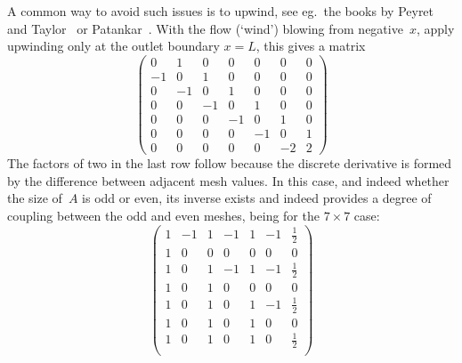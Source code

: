 A common way to avoid such issues is to upwind, see eg.\ the books by Peyret
and Taylor~\cite{peyrettaylor} or Patankar~\cite{patankar}.
With the flow (`wind') blowing from
negative~$x$, apply upwinding only  at the outlet boundary $x=L$, this gives a matrix
\begin{equation}\label{eq:matcu1}
\begin{pmatrix}
0 & 1 & 0 & 0 & 0 & 0 & 0\\
-1 & 0 & 1 & 0 & 0 & 0 & 0\\
0 & -1 & 0 & 1 & 0 & 0 & 0\\
0 & 0 & -1 & 0 & 1 & 0 & 0\\
0 & 0 & 0 & -1 & 0 & 1 & 0\\
0 & 0 & 0 & 0 & -1 & 0 & 1\\
0 & 0 & 0 & 0 & 0 & -2 & 2
\end{pmatrix}
\end{equation}
The factors of two in the last row follow because the discrete derivative
is formed by the difference between adjacent mesh values. In this case, and
indeed whether the size of~$A$ is odd or even,  its inverse exists
and indeed provides a degree of coupling between the odd and even meshes,
being for the $7 \times 7$ case:
\begin{equation}\label{eq:matcui1}
\begin{pmatrix}
1 & -1 & 1 & -1 & 1 & -1 & \frac{1}{2}\\
1 & 0 & 0 & 0 & 0 & 0 & 0\\
1 & 0 & 1 & -1 & 1 & -1 & \frac{1}{2}\\
1 & 0 & 1 & 0 & 0 & 0 & 0\\
1 & 0 & 1 & 0 & 1 & -1 & \frac{1}{2}\\
1 & 0 & 1 & 0 & 1 & 0 & 0\\
1 & 0 & 1 & 0 & 1 & 0 & \frac{1}{2}\\
\end{pmatrix}
\end{equation}


